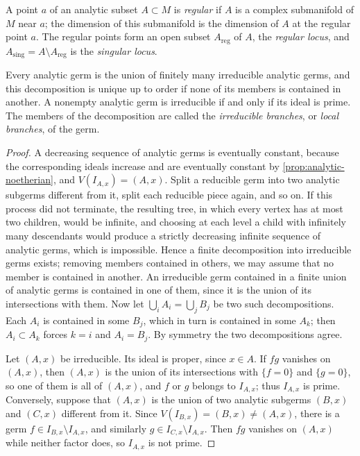 A point $a$ of an analytic subset $A\subset M$ is \emph{regular} if $A$ is a complex submanifold of $M$ near $a$; the dimension of this submanifold is the dimension of $A$ at the regular point $a$. The regular points form an open subset $A_{\mathrm{reg}}$ of $A$, the \emph{regular locus}, and $A_{\mathrm{sing}}=A\setminus A_{\mathrm{reg}}$ is the \emph{singular locus}.

\begin{proposition}\label{prop:analytic-irreducible-germs}
Every analytic germ is the union of finitely many irreducible analytic germs, and this decomposition is unique up to order if none of its members is contained in another. A nonempty analytic germ is irreducible if and only if its ideal is prime.
The members of the decomposition are called the \emph{irreducible branches}, or \emph{local branches}, of the germ.
\end{proposition}
\begin{proof}
A decreasing sequence of analytic germs is eventually constant, because the corresponding ideals increase and are eventually constant by \cref{prop:analytic-noetherian}, and $V(I_{A,x})=(A,x)$. Split a reducible germ into two analytic subgerms different from it, split each reducible piece again, and so on. If this process did not terminate, the resulting tree, in which every vertex has at most two children, would be infinite, and choosing at each level a child with infinitely many descendants would produce a strictly decreasing infinite sequence of analytic germs, which is impossible. Hence a finite decomposition into irreducible germs exists; removing members contained in others, we may assume that no member is contained in another. An irreducible germ contained in a finite union of analytic germs is contained in one of them, since it is the union of its intersections with them. Now let $\bigcup_iA_i=\bigcup_jB_j$ be two such decompositions. Each $A_i$ is contained in some $B_j$, which in turn is contained in some $A_k$; then $A_i\subset A_k$ forces $k=i$ and $A_i=B_j$. By symmetry the two decompositions agree.

Let $(A,x)$ be irreducible. Its ideal is proper, since $x\in A$. If $fg$ vanishes on $(A,x)$, then $(A,x)$ is the union of its intersections with $\{f=0\}$ and $\{g=0\}$, so one of them is all of $(A,x)$, and $f$ or $g$ belongs to $I_{A,x}$; thus $I_{A,x}$ is prime. Conversely, suppose that $(A,x)$ is the union of two analytic subgerms $(B,x)$ and $(C,x)$ different from it. Since $V(I_{B,x})=(B,x)\neq(A,x)$, there is a germ $f\in I_{B,x}\setminus I_{A,x}$, and similarly $g\in I_{C,x}\setminus I_{A,x}$. Then $fg$ vanishes on $(A,x)$ while neither factor does, so $I_{A,x}$ is not prime.
\end{proof}


